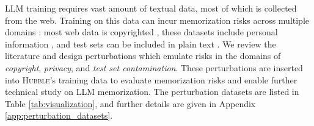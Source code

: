 \documentclass{article} %
\begin{document}
LLM training requires vast amount of textual data, most of which is collected from the web. Training on this data can incur memorization risks across multiple domains \citep{hartmann2023sokmemorizationgeneralpurposelarge,satvaty2025undesirablememorizationlargelanguage}: most web data is copyrighted \citep{Longpre2024}, these datasets include personal information \citep{hong2025commonpoolprivacyproblems}, and test sets can be included in plain text \citep{jacovi-etal-2023-stop}. We review the literature and design perturbations which emulate risks in the domains of \textit{copyright}, \textit{privacy}, and \textit{test set contamination}. These perturbations are inserted into \textsc{Hubble}'s training data to evaluate memorization risks and enable further technical study on LLM memorization. The perturbation datasets are listed in Table \ref{tab:visualization}, and further details are given in Appendix \ref{app:perturbation_datasets}.
\end{document}
